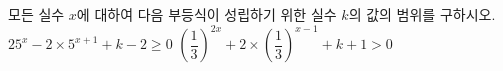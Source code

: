 모든 실수 $x$에 대하여 다음 부등식이 성립하기 위한 실수 $k$의 값의 범위를 구하시오.
 $25^{x}-2\times 5^{x+1}+k-2\ge 0$
 $\left(\dfrac{1}{3}\right)^{2x}+2\times\left(\dfrac{1}{3}\right)^{x-1}+k+1>0$

